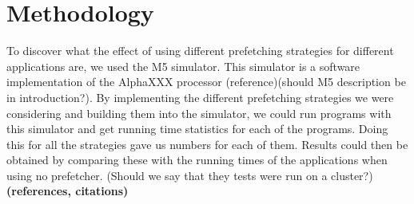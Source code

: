 
\section{Methodology}
\label{sec:methodology}



To discover what the effect of using different prefetching strategies
for different applications are, we used the M5 simulator. This
simulator is a software implementation of the AlphaXXX processor
(reference)(should M5 description be in introduction?). By
implementing the different prefetching strategies we were considering
and building them into the simulator, we could run programs with this
simulator and get running time statistics for each of the
programs. Doing this for all the strategies gave us numbers for each
of them. Results could then be obtained by comparing these with the
running times of the applications when using no prefetcher. (Should we
say that they tests were run on a cluster?)
{\bf (references, citations)}
